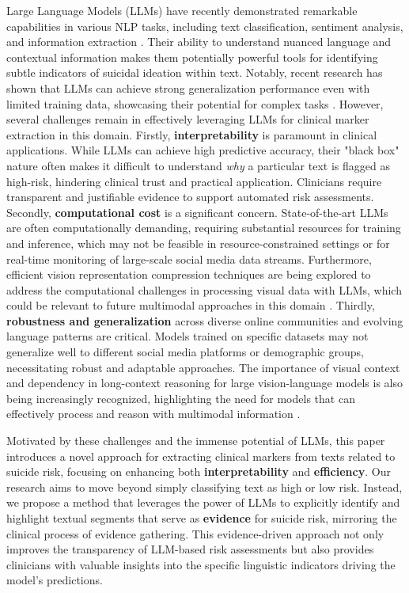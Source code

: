 Large Language Models (LLMs) have recently demonstrated remarkable capabilities in various NLP tasks, including text classification, sentiment analysis, and information extraction \cite{Vaswani2017}. Their ability to understand nuanced language and contextual information makes them potentially powerful tools for identifying subtle indicators of suicidal ideation within text.  Notably, recent research has shown that LLMs can achieve strong generalization performance even with limited training data, showcasing their potential for complex tasks \cite{zhou2025weak}. However, several challenges remain in effectively leveraging LLMs for clinical marker extraction in this domain. Firstly, \textbf{interpretability} is paramount in clinical applications. While LLMs can achieve high predictive accuracy, their "black box" nature often makes it difficult to understand \textit{why} a particular text is flagged as high-risk, hindering clinical trust and practical application. Clinicians require transparent and justifiable evidence to support automated risk assessments. Secondly, \textbf{computational cost} is a significant concern. State-of-the-art LLMs are often computationally demanding, requiring substantial resources for training and inference, which may not be feasible in resource-constrained settings or for real-time monitoring of large-scale social media data streams.  Furthermore, efficient vision representation compression techniques are being explored to address the computational challenges in processing visual data with LLMs, which could be relevant to future multimodal approaches in this domain \cite{zhou2024less}. Thirdly, \textbf{robustness and generalization} across diverse online communities and evolving language patterns are critical. Models trained on specific datasets may not generalize well to different social media platforms or demographic groups, necessitating robust and adaptable approaches.  The importance of visual context and dependency in long-context reasoning for large vision-language models is also being increasingly recognized, highlighting the need for models that can effectively process and reason with multimodal information \cite{zhou2024rethinking}.

Motivated by these challenges and the immense potential of LLMs, this paper introduces a novel approach for extracting clinical markers from texts related to suicide risk, focusing on enhancing both \textbf{interpretability} and \textbf{efficiency}. Our research aims to move beyond simply classifying text as high or low risk. Instead, we propose a method that leverages the power of LLMs to explicitly identify and highlight textual segments that serve as \textbf{evidence} for suicide risk, mirroring the clinical process of evidence gathering. This evidence-driven approach not only improves the transparency of LLM-based risk assessments but also provides clinicians with valuable insights into the specific linguistic indicators driving the model's predictions.

